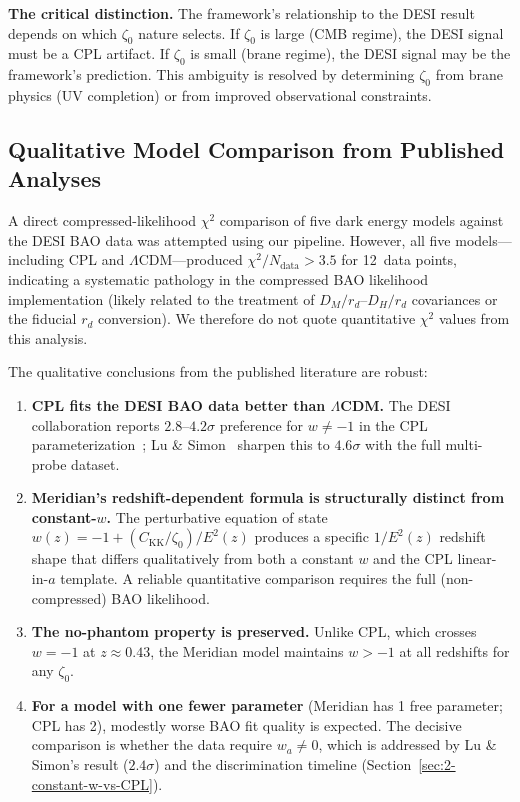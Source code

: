 \textbf{The critical distinction.} The framework's relationship to the DESI result depends on which $\zeta_0$ nature selects. If $\zeta_0$ is large (CMB regime), the DESI signal must be a CPL artifact. If $\zeta_0$ is small (brane regime), the DESI signal may be the framework's prediction. This ambiguity is resolved by determining $\zeta_0$ from brane physics (UV completion) or from improved observational constraints.

\subsection{Qualitative Model Comparison from Published Analyses}
\label{sec:2-DESI-chi2}

A direct compressed-likelihood $\chi^2$ comparison of five dark energy models against the DESI BAO data was attempted using our pipeline. However, all five models---including CPL and $\Lambda$CDM---produced $\chi^2/N_\mathrm{data} > 3.5$ for 12~data points, indicating a systematic pathology in the compressed BAO likelihood implementation (likely related to the treatment of $D_M/r_d$--$D_H/r_d$ covariances or the fiducial $r_d$ conversion). We therefore do not quote quantitative $\chi^2$ values from this analysis.

The qualitative conclusions from the published literature are robust:
\begin{enumerate}
\item \textbf{CPL fits the DESI BAO data better than $\Lambda$CDM.} The DESI collaboration reports $2.8$--$4.2\sigma$ preference for $w \neq -1$ in the CPL parameterization~\cite{ch2:DESIDR2}; Lu \& Simon~\cite{ch2:LuSimon2026} sharpen this to $4.6\sigma$ with the full multi-probe dataset.
\item \textbf{Meridian's redshift-dependent formula is structurally distinct from constant-$w$.} The perturbative equation of state $w(z) = -1 + (C_\mathrm{KK}/\zeta_0)/E^2(z)$ produces a specific $1/E^2(z)$ redshift shape that differs qualitatively from both a constant $w$ and the CPL linear-in-$a$ template. A reliable quantitative comparison requires the full (non-compressed) BAO likelihood.
\item \textbf{The no-phantom property is preserved.} Unlike CPL, which crosses $w = -1$ at $z \approx 0.43$, the Meridian model maintains $w > -1$ at all redshifts for any $\zeta_0$.
\item \textbf{For a model with one fewer parameter} (Meridian has 1 free parameter; CPL has 2), modestly worse BAO fit quality is expected. The decisive comparison is whether the data require $w_a \neq 0$, which is addressed by Lu \& Simon's result ($2.4\sigma$) and the discrimination timeline (Section~\ref{sec:2-constant-w-vs-CPL}).
\end{enumerate}

